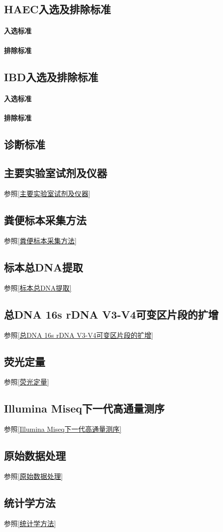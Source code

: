     \subsection{HAEC入选及排除标准}
      \paragraph{入选标准}
      \paragraph{排除标准}
    \subsection{IBD入选及排除标准}
      \paragraph{入选标准}
      \paragraph{排除标准}

  \subsection{诊断标准}

  \subsection{主要实验室试剂及仪器}
  参照\ref{主要实验室试剂及仪器}
  \subsection{粪便标本采集方法}
  参照\ref{粪便标本采集方法}
  \subsection{标本总DNA提取}
  参照\ref{标本总DNA提取}
  \subsection{总DNA 16s rDNA V3-V4可变区片段的扩增}
  参照\ref{总DNA 16s rDNA V3-V4可变区片段的扩增}
  \subsection{荧光定量}
  参照\ref{荧光定量}
  \subsection{Illumina Miseq下一代高通量测序}
  参照\ref{Illumina Miseq下一代高通量测序}
  \subsection{原始数据处理}
  参照\ref{原始数据处理}
  \subsection{统计学方法}
  参照\ref{统计学方法}
